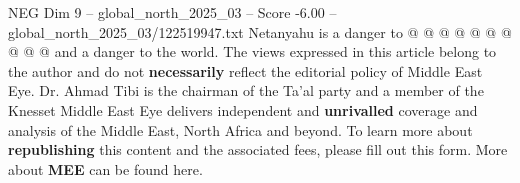 \begin{textsample}{NEG Dim 9 – global\_north\_2025\_03 – Score -6.00 – global\_north\_2025\_03/122519947.txt}
Netanyahu is a danger to @ @ @ @ @ @ @ @ @ @ and a danger to the world.
The views expressed in this article belong to the author and do not \textbf{necessarily} reflect the editorial policy of Middle East Eye.
Dr.
Ahmad Tibi is the chairman of the Ta'al party and a member of the Knesset Middle East Eye delivers independent and \textbf{unrivalled} coverage and analysis of the Middle East, North Africa and beyond.
To learn more about \textbf{republishing} this content and the associated fees, please fill out this form.
More about \textbf{MEE} can be found here.

\end{textsample}
